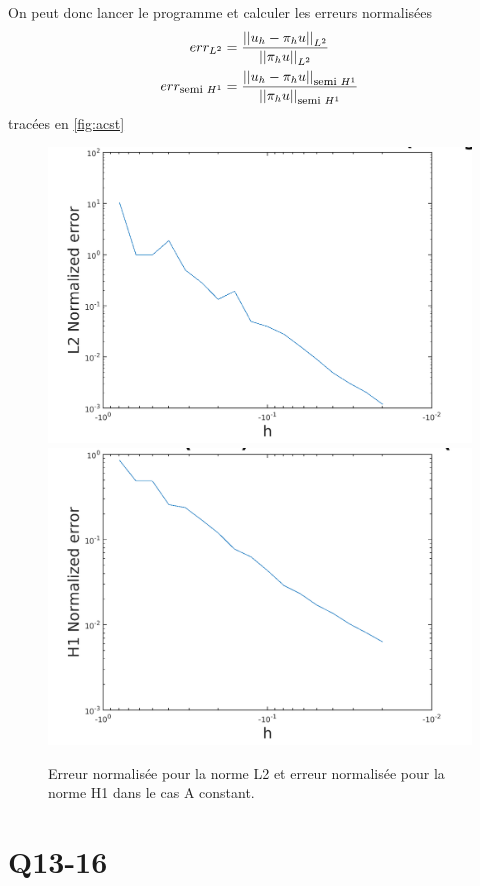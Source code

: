\documentclass[11pt]{article}
\newcommand{\smbox}[1]{\mbox{\footnotesize #1}}
\newcommand{\norm}[1]{\left|\left|#1\right|\right|}
\begin{document}
On peut donc lancer le programme et calculer les erreurs normalisées
\begin{align}
  err_{L^2} &= \frac{\norm{u_h-\pi_h u}_{L^2}}{\norm{\pi_h u}_{L^2}} \\
  err_{\smbox{semi~} H^1} &= \frac{\norm{u_h-\pi_h u}_{\smbox{semi~}H^1}}{\norm{\pi_h u}_{\smbox{semi~}H^1}} 
\end{align}
tracées en \autoref{fig:acst}


\begin{figure}
  \centering
  \includegraphics[width=.6\textwidth]{L2_Acst} \\
  \includegraphics[width=.6\textwidth]{H1_Acst}
  \caption{Erreur normalisée pour la norme L2 et erreur normalisée pour la norme H1 dans le cas A constant.}
  \label{fig:acst}
\end{figure}


\section{Q13-16}
\end{document}
